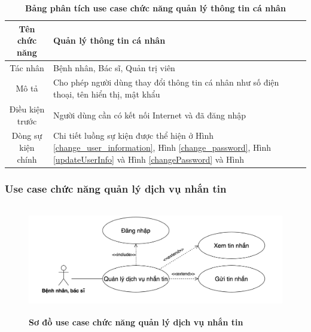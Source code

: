   \begin{table}[H]
    \caption{\bfseries \fontsize{12pt}{0pt}\selectfont Bảng phân tích use case chức năng quản lý thông tin cá nhân}
    \centering
    \begin{tabularx}{0.9\textwidth}{|c|X|}
      \hline
      \textbf{Tên chức năng} & \textbf{Quản lý thông tin cá nhân} \\
      \hline
      Tác nhân & Bệnh nhân, Bác sĩ, Quản trị viên \\
      \hline
      Mô tả & Cho phép người dùng thay đổi thông tin cá nhân như số điện thoại, tên hiển thị, mật khẩu \\
      \hline
      Điều kiện trước & Người dùng cần có kết nối Internet và đã đăng nhập \\
      \hline
      Dòng sự kiện chính & 
        Chi tiết luồng sự kiện được thể hiện ở Hình \ref{change_user_information}, Hình \ref{change_password}, 
        Hình \ref{updateUserInfo} và Hình \ref{changePassword}
        và Hình\\
      \hline
    \end{tabularx}
  \end{table}

\subsubsection{Use case chức năng quản lý dịch vụ nhắn tin}
  \begin{figure}[H]
    \centering
    \includegraphics[width=12cm,height=4.8cm]{Images/use_case/use_case_send_receive_message.png}
    \caption[Sơ đồ use case chức năng quản lý dịch vụ nhắn tin]{\bfseries \fontsize{12pt}{0pt}
    \selectfont Sơ đồ use case chức năng quản lý dịch vụ nhắn tin}
    \label{use_case_send_receive_message} %
  \end{figure}

